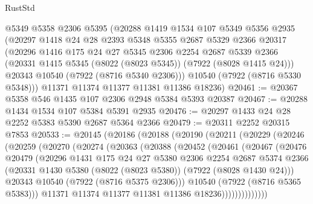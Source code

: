 \begin{lexlean}{RustStd}
\begin{coremodule}
    @5349
    @5358
    @2306
    @5395
    (@20288
      @1419
      @1534
      @107
      @5349
      @5356
      @2935
      (@20297
        @1418
        @24
        @28
        @2393
        @5348
        @5355
        @2687
        @5329
        @2366
        @20317
        (@20296
          @1416
          @175
          @24
          @27
          @5345
          @2306
          @2254
          @2687
          @5339
          @2366
          (@20331 @1415 @5345 (@8022 (@8023 @5345)) (@7922 (@8028 @1415 @24)))
          @20343
          @10540
          (@7922 (@8716 @5340 @2306)))
        @10540
        (@7922 (@8716 @5330 @5348)))
      @11371
      @11374
      @11377
      @11381
      @11386
      @18236)
@20461 := @20367 @5358 @546 @1435 @107 @2306 @2948 @5384 @5393 @20387
@20467 := @20288 @1434 @1534 @107 @5384 @5391 @2935
@20476 := @20297 @1433 @24 @28 @2252 @5383 @5390 @2687 @5364 @2366
@20479 := @20311 @2252 @20315 @7853
@20533 := @20145
    (@20186
      (@20188
        (@20190
          (@20211
            (@20229
              (@20246
                (@20259
                  (@20270
                    (@20274
                      (@20363
                        (@20388
                          (@20452
                            (@20461
                              (@20467
                                (@20476
                                  @20479
                                  (@20296
                                    @1431
                                    @175
                                    @24
                                    @27
                                    @5380
                                    @2306
                                    @2254
                                    @2687
                                    @5374
                                    @2366
                                    (@20331
                                      @1430
                                      @5380
                                      (@8022 (@8023 @5380))
                                      (@7922 (@8028 @1430 @24)))
                                    @20343
                                    @10540
                                    (@7922 (@8716 @5375 @2306)))
                                  @10540
                                  (@7922 (@8716 @5365 @5383)))
                                @11371
                                @11374
                                @11377
                                @11381
                                @11386
                                @18236))))))))))))))

\end{coremodule}
\end{lexlean}
